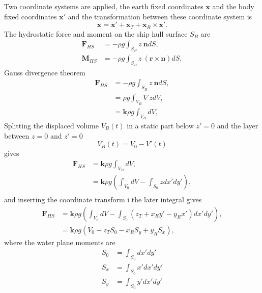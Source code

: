 \documentclass[]{book}
\newcommand{\V}[1]{\boldsymbol{#1}}
\begin{document}
Two coordinate systems are applied, the earth fixed coordinates $\V{x}$ and the body fixed coordinates $\V{x}'$ and the transformation between these coordinate system is
\begin{equation}
	\V{x} = \V{x}' + \V{x}_T +  \V{x}_R \times \V{x}'.
\end{equation}
The hydrostatic force and moment on the ship hull surface $S_B$ are
\begin{align}
\V{F}_{HS} &=- \rho g \int_{S_B}  z ~\V{n} dS,  \\
\V{M}_{HS} &=- \rho g \int_{S_B}  z ~ (\V{r} \times \V{n}) dS,
\end{align}
Gauss divergence theorem
\begin{align}
\V{F}_{HS} 	&=- \rho g \int_{S_B}  z ~\V{n} dS,  \\
			&= \rho g \int_{V_B} \nabla z  dV,  \\
			&= \V{k} \rho g \int_{V_B} dV,  
\end{align}
Splitting the displaced volume $V_B(t)$ in a static part below $z'=0$ and the layer between $z=0$ and $z'=0$
\begin{equation}
	V_B(t) = V_0 - V'(t)
\end{equation}
gives 
\begin{align}
\V{F}_{HS} 	&= \V{k} \rho g \int_{V_B} dV,  \\
			&= \V{k} \rho g\left( \int_{V_0} dV - \int_{S_0}  z  dx'dy' \right),  \\
\end{align}
and inserting the coordinate transform i the later integral gives
\begin{align}
\V{F}_{HS}&= \V{k} \rho g\left( \int_{V_0} dV - \int_{S_0}  (z_T + x_R y' - y_R x')  dx'dy' \right),  \\
&= \V{k} \rho g\left( V_0
- z_T S_0   
- x_R S_y 
+ y_R S_x\right),  
\end{align}
where the water plane moments are
\begin{align}
S_0&=\int_{S_0} dx'dy'   \\
S_x&=\int_{S_0}   x'  dx'dy' \\
S_y&=\int_{S_0}   y'  dx'dy' 
\end{align}
\end{document}

